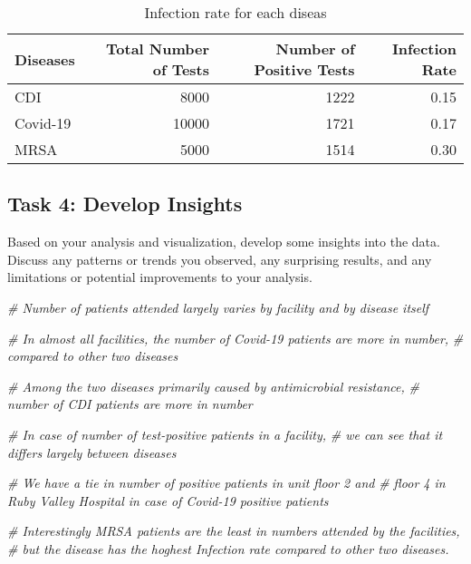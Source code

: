 \documentclass[
]{article}
\newenvironment{Shaded}{\begin{snugshade}}{\end{snugshade}}
\newcommand{\CommentTok}[1]{\textcolor[rgb]{0.56,0.35,0.01}{\textit{#1}}}
\begin{document}
\begin{table}[!h]

\caption{\label{tab:unnamed-chunk-1}Infection rate for each diseas}
\centering
\begin{tabular}[t]{l|r|r|r}
\hline
Diseases & Total Number of Tests & Number of Positive Tests & Infection Rate\\
\hline
CDI & 8000 & 1222 & 0.15\\
\hline
Covid-19 & 10000 & 1721 & 0.17\\
\hline
MRSA & 5000 & 1514 & 0.30\\
\hline
\end{tabular}
\end{table}

\hypertarget{task-4-develop-insights}{%
\subsection{Task 4: Develop Insights}\label{task-4-develop-insights}}

Based on your analysis and visualization, develop some insights into the
data. Discuss any patterns or trends you observed, any surprising
results, and any limitations or potential improvements to your analysis.

\begin{Shaded}
\begin{Highlighting}[]
\CommentTok{\# Number of patients attended largely varies by facility and by disease itself}

\CommentTok{\# In almost all facilities, the number of Covid{-}19 patients are more in number, }
\CommentTok{\# compared to other two diseases}

\CommentTok{\# Among the two diseases primarily caused by antimicrobial resistance, }
\CommentTok{\# number of CDI patients are more in number}

\CommentTok{\# In case of number of test{-}positive patients in a facility, }
\CommentTok{\# we can see that it differs largely between diseases}

\CommentTok{\# We have a tie in number of positive patients in unit floor 2 and }
\CommentTok{\# floor 4 in Ruby Valley Hospital in case of Covid{-}19 positive patients}

\CommentTok{\# Interestingly MRSA patients are the least in numbers attended by the facilities, }
\CommentTok{\# but the disease has the hoghest Infection rate compared to other two diseases.}
\end{Highlighting}
\end{Shaded}
\end{document}
